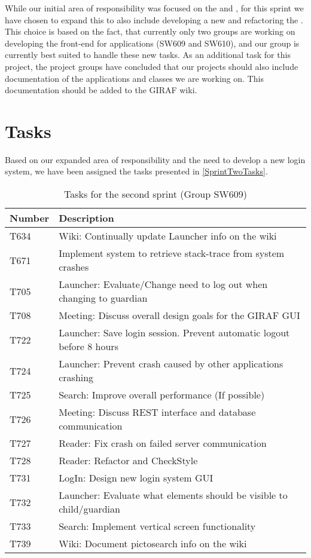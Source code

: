 While our initial area of responsibility was focused on the  and
, for this sprint we have chosen to expand this to
also include developing a new  and refactoring the
. This choice is based on the fact, that currently only
two groups are working on developing the front-end for applications (SW609 and
SW610), and our group is currently best suited to handle these new tasks. As an
additional task for this project, the project groups have concluded that our
projects should also include documentation of the applications and classes we
are working on. This documentation should be added to the GIRAF wiki.

\section{Tasks}
Based on our expanded area of responsibility and the need to develop a new login
system, we have been assigned the tasks presented in \autoref{SprintTwoTasks}.

\begin{table}[H]
\centering
\begin{tabular}{|l|l|}
\hline
Number	& Description												\\\hline
T634  	& Wiki: Continually update Launcher info on the wiki\\\hline 
T671    & Implement system to retrieve stack-trace from system crashes \\\hline 
T705	& Launcher: Evaluate/Change need to log out when changing  to guardian\\\hline 
T708    & Meeting: Discuss overall design goals for the GIRAF GUI \\\hline
T722   	& Launcher: Save login session. Prevent automatic logout before 8 hours \\\hline 
T724   	& Launcher: Prevent crash caused by other applications crashing\\\hline
T725  	& Search: Improve overall performance (If possible)			   							\\\hline
T726    & Meeting: Discuss REST interface and database communication \\\hline
T727    & Reader: Fix crash on failed server communication  				\\\hline 
T728	& Reader: Refactor and CheckStyle \\\hline
T731    & LogIn: Design new login system GUI               			\\\hline
T732    & Launcher: Evaluate what elements should be visible to child/guardian\\\hline 
T733    & Search: Implement vertical screen functionality    			\\\hline 
T739    & Wiki: Document pictosearch info on the wiki	\\\hline
\end{tabular}
\caption{Tasks for the second sprint (Group SW609)} 
\label{SprintTwoTasks}    
\end{table} 

